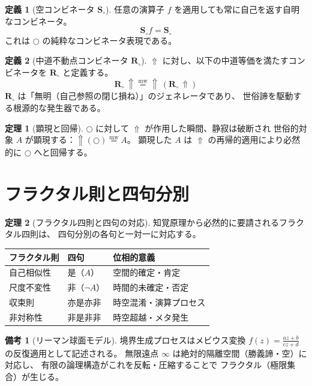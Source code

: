 \documentclass[11pt,a4paper]{ltjsarticle}
\newcommand{\mweq}{\mathrel{\overset{\mathrm{mw}}{=}}}
\newcommand{\metanegation}{\Uparrow}
\newcommand{\dfix}{\bigcirc}
\newcommand{\Rmw}{\mathbf{R}_{\circ}}
\newcommand{\Svoid}{\mathbf{S}_{\circ}}
\theoremstyle{definition}
\newtheorem{definition}{定義}[section]
\newtheorem{theorem}{定理}[section]
\newtheorem{remark}{備考}[section]
\begin{document}
\begin{definition}[空コンビネータ $\Svoid$]
任意の演算子 $f$ を適用しても常に自己を返す自明なコンビネータ。
\[
\Svoid f = \Svoid
\]
これは $\dfix$ の純粋なコンビネータ表現である。
\end{definition}

\begin{definition}[中道不動点コンビネータ $\Rmw$]
$\metanegation$ に対し、以下の中道等価を満たすコンビネータを $\Rmw$ と定義する。
\[
\Rmw\,\metanegation \mweq \metanegation\,(\Rmw\,\metanegation)
\]
$\Rmw$ は「無明（自己参照の閉じ損ね）」のジェネレータであり、
世俗諦を駆動する根源的な発生器である。
\end{definition}

\begin{theorem}[顕現と回帰]
$\dfix$ に対して $\metanegation$ が作用した瞬間、静寂は破断され
世俗的対象 $A$ が顕現する：$\metanegation(\dfix) \mweq A$。
顕現した $A$ は $\metanegation$ の再帰的適用により必然的に $\dfix$ へと回帰する。
\end{theorem}

\section{フラクタル則と四句分別}

\begin{theorem}[フラクタル四則と四句の対応]
知覚原理から必然的に要請されるフラクタル四則は、
四句分別の各句と一対一に対応する。
\begin{center}
\begin{tabular}{lll}
\hline
\textbf{フラクタル則} & \textbf{四句} & \textbf{位相的意義} \\
\hline
自己相似性 & 是（$A$） & 空間的確定・肯定 \\
尺度不変性 & 非（$\neg A$） & 時間的未確定・否定 \\
収束則 & 亦是亦非 & 時空混淆・演算プロセス \\
非対称性 & 非是非非 & 時空超越・メタ発生 \\
\hline
\end{tabular}
\end{center}
\end{theorem}

\begin{remark}[リーマン球面モデル]
境界生成プロセスはメビウス変換 $f(z)=\frac{az+b}{cz+d}$ の反復適用として記述される。
無限遠点 $\infty$ は絶対的隔離空間（勝義諦・空）に対応し、
有限の論理構造がこれを反転・圧縮することで
フラクタル（極限集合）が生じる。
\end{remark}
\end{document}
